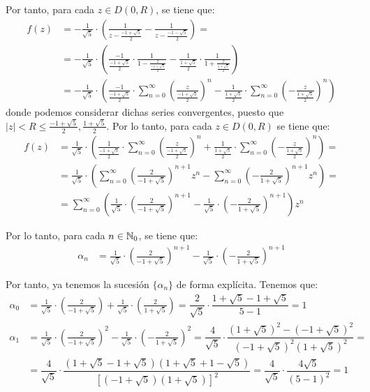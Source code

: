 \begin{ejercicio}
    Por tanto, para cada $z\in D\left(0,R\right)$, se tiene que:
    \begin{align*}
        f(z) &= -\frac{1}{\sqrt{5}}\cdot \left(\frac{1}{z-\frac{-1+\sqrt{5}}{2}}-\frac{1}{z-\frac{-1-\sqrt{5}}{2}}\right)
        =\\&= -\frac{1}{\sqrt{5}}\cdot \left(\frac{-1}{\frac{-1+\sqrt{5}}{2}}\cdot \frac{1}{1-\frac{z}{\frac{-1+\sqrt{5}}{2}}}-\frac{1}{\frac{1+\sqrt{5}}{2}}\cdot \frac{1}{1+\frac{z}{\frac{1+\sqrt{5}}{2}}}\right) \\
        &= -\frac{1}{\sqrt{5}}\cdot \left(\frac{-1}{\frac{-1+\sqrt{5}}{2}}\cdot \sum_{n=0}^{\infty} \left(\frac{z}{\frac{-1+\sqrt{5}}{2}}\right)^n-\frac{1}{\frac{1+\sqrt{5}}{2}}\cdot \sum_{n=0}^{\infty} \left(-\frac{z}{\frac{1+\sqrt{5}}{2}}\right)^n\right)
    \end{align*}
    donde podemos considerar dichas series convergentes, puesto que $|z|<R\leq \frac{-1+\sqrt{5}}{2}, \frac{1+\sqrt{5}}{2}$. Por lo tanto, para cada $z\in D\left(0,R\right)$ se tiene que:
    \begin{align*}
        f(z) &= \frac{1}{\sqrt{5}}\cdot \left(\frac{1}{\frac{-1+\sqrt{5}}{2}}\cdot \sum_{n=0}^{\infty} \left(\frac{z}{\frac{-1+\sqrt{5}}{2}}\right)^n+\frac{1}{\frac{1+\sqrt{5}}{2}}\cdot \sum_{n=0}^{\infty} \left(-\frac{z}{\frac{1+\sqrt{5}}{2}}\right)^n\right)
        =\\&= \frac{1}{\sqrt{5}}\cdot \left(\sum_{n=0}^{\infty} \left(\frac{2}{-1+\sqrt{5}}\right)^{n+1}z^n-\sum_{n=0}^{\infty} \left(-\frac{2}{1+\sqrt{5}}\right)^{n+1}z^n\right)
        =\\&= \sum_{n=0}^{\infty} \left(\frac{1}{\sqrt{5}}\cdot \left(\frac{2}{-1+\sqrt{5}}\right)^{n+1}-\frac{1}{\sqrt{5}}\cdot \left(-\frac{2}{1+\sqrt{5}}\right)^{n+1}\right)z^n
    \end{align*}

    Por lo tanto, para cada $n\in \mathbb{N}_0$, se tiene que:
    \begin{align*}
        \alpha_n &= \frac{1}{\sqrt{5}}\cdot \left(\frac{2}{-1+\sqrt{5}}\right)^{n+1}-\frac{1}{\sqrt{5}}\cdot \left(-\frac{2}{1+\sqrt{5}}\right)^{n+1}
    \end{align*}

    Por tanto, ya tenemos la sucesión $\{\alpha_n\}$ de forma explícita. Tenemos que:
    \begin{align*}
        \alpha_0 &= \frac{1}{\sqrt{5}}\cdot \left(\frac{2}{-1+\sqrt{5}}\right)+\frac{1}{\sqrt{5}}\cdot \left(\frac{2}{1+\sqrt{5}}\right) = \dfrac{2}{\sqrt{5}}\cdot \dfrac{1+\sqrt{5}-1+\sqrt{5}}{5-1} = 1\\
        \alpha_1 &= \frac{1}{\sqrt{5}}\cdot \left(\frac{2}{-1+\sqrt{5}}\right)^2-\frac{1}{\sqrt{5}}\cdot \left(-\frac{2}{1+\sqrt{5}}\right)^2 = \dfrac{4}{\sqrt{5}}\cdot \dfrac{(1+\sqrt{5})^2-(-1+\sqrt{5})^2}{(-1+\sqrt{5})^2(1+\sqrt{5})^2}
        =\\&= \dfrac{4}{\sqrt{5}}\cdot \dfrac{(1+\sqrt{5}-1+\sqrt{5})(1+\sqrt{5}+1-\sqrt{5})}{[(-1+\sqrt{5})(1+\sqrt{5})]^2}
        = \dfrac{4}{\sqrt{5}}\cdot \dfrac{4\sqrt{5}}{(5-1)^2}=1
    \end{align*}


\end{ejercicio}
